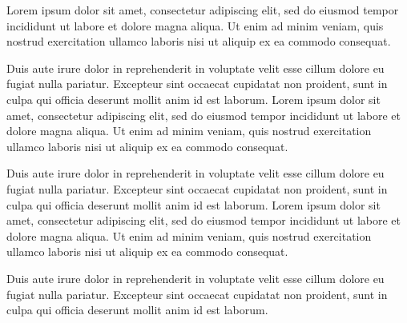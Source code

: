 \documentclass[oneside]{memoir}
\begin{document}
\thispagestyle{empty}
Lorem ipsum dolor sit amet, consectetur adipiscing elit, sed do eiusmod tempor incididunt ut labore et dolore magna aliqua. Ut enim ad minim veniam, quis nostrud exercitation ullamco laboris nisi ut aliquip ex ea commodo consequat.

Duis aute irure dolor in reprehenderit in voluptate velit esse cillum dolore eu fugiat nulla pariatur. Excepteur sint occaecat cupidatat non proident, sunt in culpa qui officia deserunt mollit anim id est laborum.
\newpage
\thispagestyle{plain}
Lorem ipsum dolor sit amet, consectetur adipiscing elit, sed do eiusmod tempor incididunt ut labore et dolore magna aliqua. Ut enim ad minim veniam, quis nostrud exercitation ullamco laboris nisi ut aliquip ex ea commodo consequat.

Duis aute irure dolor in reprehenderit in voluptate velit esse cillum dolore eu fugiat nulla pariatur. Excepteur sint occaecat cupidatat non proident, sunt in culpa qui officia deserunt mollit anim id est laborum.
\clearpage
Lorem ipsum dolor sit amet, consectetur adipiscing elit, sed do eiusmod tempor incididunt ut labore et dolore magna aliqua. Ut enim ad minim veniam, quis nostrud exercitation ullamco laboris nisi ut aliquip ex ea commodo consequat.

Duis aute irure dolor in reprehenderit in voluptate velit esse cillum dolore eu fugiat nulla pariatur. Excepteur sint occaecat cupidatat non proident, sunt in culpa qui officia deserunt mollit anim id est laborum.
\end{document}
